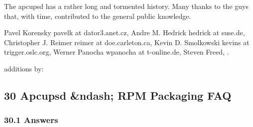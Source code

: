 The apcupsd has a rather long and tormented history. Many thanks to the guys
that, with time, contributed to the general public knowledge.  

Pavel Korensky \lt{}pavelk at dator3.anet.cz\gt{}, Andre M. Hedrick
\lt{}hedrick at suse.de\gt{}, Christopher J. Reimer \lt{}reimer at
doe.carleton.ca\gt{}, Kevin D. Smolkowski \lt{}kevins at
trigger.oslc.org\gt{}, Werner Panocha \lt{}wpanocha at t-online.de\gt{},
Steven Freed, 
.  

additions by: 

\label{Apcupsd-_002d_002d-RPM-Packaging-FAQ}

\subsection*{30 Apcupsd \&ndash; RPM Packaging FAQ}

\label{Answers}

\subsubsection*{30.1 Answers}


